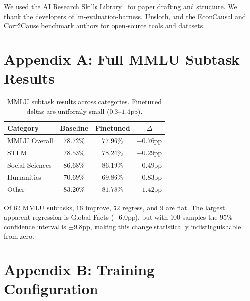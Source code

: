 \documentclass[sigconf]{acmart}
\begin{document}
We used the AI Research Skills Library~\cite{ai_research_skills} for paper drafting and structure. We thank the developers of lm-evaluation-harness, Unsloth, and the EconCausal and Corr2Cause benchmark authors for open-source tools and datasets.




\appendix

\section{Appendix A: Full MMLU Subtask Results}

\begin{table}
\caption{MMLU subtask results across categories. Finetuned deltas are uniformly small ($0.3$--$1.4$pp).}
\label{tab:mmlu_full}
\begin{tabular}{lccc}
\toprule
Category & Baseline & Finetuned & $\Delta$ \\
\midrule
MMLU Overall & $78.72\%$ & $77.96\%$ & $-0.76$pp \\
STEM & $78.53\%$ & $78.24\%$ & $-0.29$pp \\
Social Sciences & $86.68\%$ & $86.19\%$ & $-0.49$pp \\
Humanities & $70.69\%$ & $69.86\%$ & $-0.83$pp \\
Other & $83.20\%$ & $81.78\%$ & $-1.42$pp \\
\bottomrule
\end{tabular}
\end{table}

Of $62$ MMLU subtasks, $16$ improve, $32$ regress, and $9$ are flat. The largest apparent regression is Global Facts ($-6.0$pp), but with $100$ samples the $95\%$ confidence interval is $\pm9.8$pp, making this change statistically indistinguishable from zero.

\section{Appendix B: Training Configuration}
\end{document}
